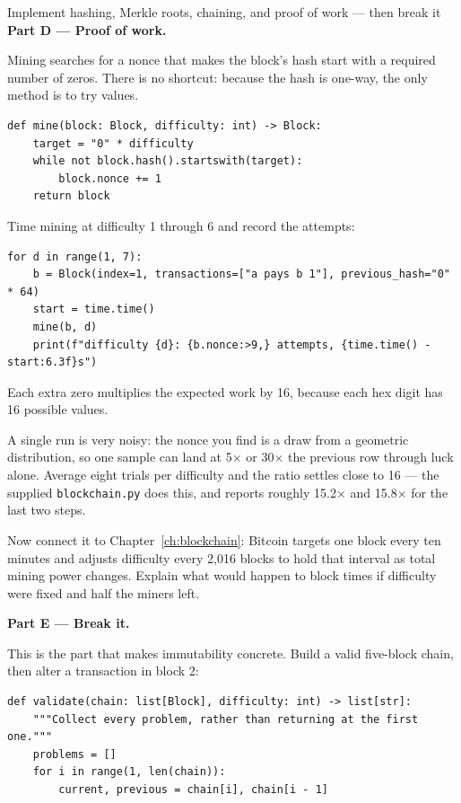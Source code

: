 \begin{labproject}{Implement hashing, Merkle roots, chaining, and proof of work --- then break it}
\medskip\noindent\textbf{Part D --- Proof of work.}\par
Mining searches for a nonce that makes the block's hash start with a required number of zeros. There is no shortcut: because the hash is one-way, the only method is to try values.

\begin{lstlisting}[style=mlpython]
def mine(block: Block, difficulty: int) -> Block:
    target = "0" * difficulty
    while not block.hash().startswith(target):
        block.nonce += 1
    return block
\end{lstlisting}

\begin{tryit}
Time mining at difficulty 1 through 6 and record the attempts:

\begin{lstlisting}[style=mlpython]
for d in range(1, 7):
    b = Block(index=1, transactions=["a pays b 1"], previous_hash="0" * 64)
    start = time.time()
    mine(b, d)
    print(f"difficulty {d}: {b.nonce:>9,} attempts, {time.time() - start:6.3f}s")
\end{lstlisting}

Each extra zero multiplies the expected work by 16, because each hex digit has 16 possible values.

A single run is very noisy: the nonce you find is a draw from a geometric distribution, so one sample can land at 5$\times$ or 30$\times$ the previous row through luck alone. Average eight trials per difficulty and the ratio settles close to 16 --- the supplied \texttt{blockchain.py} does this, and reports roughly 15.2$\times$ and 15.8$\times$ for the last two steps.

Now connect it to Chapter~\ref{ch:blockchain}: Bitcoin targets one block every ten minutes and adjusts difficulty every 2{,}016 blocks to hold that interval as total mining power changes. Explain what would happen to block times if difficulty were fixed and half the miners left.
\end{tryit}

\medskip\noindent\textbf{Part E --- Break it.}\par
This is the part that makes immutability concrete. Build a valid five-block chain, then alter a transaction in block 2:

\begin{lstlisting}[style=mlpython]
def validate(chain: list[Block], difficulty: int) -> list[str]:
    """Collect every problem, rather than returning at the first one."""
    problems = []
    for i in range(1, len(chain)):
        current, previous = chain[i], chain[i - 1]


\end{lstlisting}
\end{labproject}
